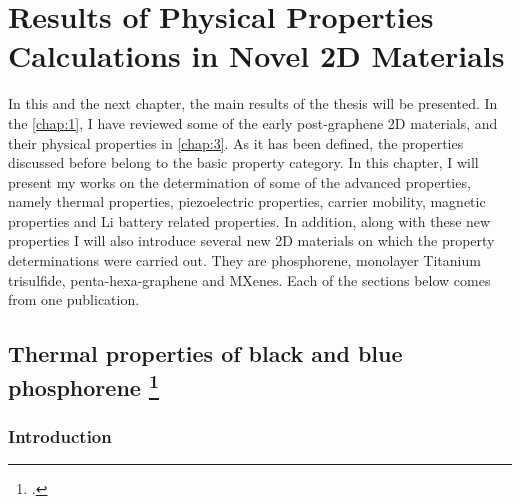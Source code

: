 
\chapter{Results of Physical Properties Calculations in Novel 2D Materials \label{chap:4}}

\ifpdf
    \graphicspath{{Chapter4/Figs/Raster/}{Chapter4/Figs/PDF/}{Chapter4/Figs/Vector/}}
\else
    \graphicspath{{Chapter4/Figs/Vector/}{Chapter4/Figs/}}
\fi


\nocite{Yimamu2012,Aierken2017.GNR}


In this and the next chapter, the main results of the thesis will be presented. In the \autoref{chap:1}, I have reviewed some of the early post-graphene 2D materials, and their physical properties in \autoref{chap:3}. As it has been defined, the properties discussed before belong to the basic property category. In this chapter, I will present my works on the determination of some of the advanced properties, namely thermal properties, piezoelectric properties, carrier mobility, magnetic properties and Li battery related properties. In addition, along with these new properties I will also introduce several new 2D materials on which the property determinations were carried out. They are phosphorene, monolayer Titanium trisulfide, penta-hexa-graphene and MXenes. Each of the sections below comes from one publication. 

\section[Thermal properties of black and blue phosphorene]{Thermal properties of black and blue phosphorene \footcite[This work is published in:][]{Aierken2015.thermalP} }


\subsection{Introduction}

